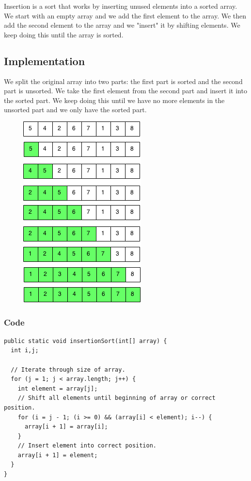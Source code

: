 \documentclass[11pt,oneside]{book}
\makeatletter
\def\maxwidth#1{\ifdim\Gin@nat@width>#1 #1\else\Gin@nat@width\fi}
\makeatother
\begin{document}
Insertion is a sort that works by inserting unused elements into a sorted array. We start with an empty array and we add the first element to the array. We then add the second element to the array and we "insert" it by shifting elements. We keep doing this until the array is sorted.

\subsection{Implementation}

We split the original array into two parts: the first part is sorted and the second part is unsorted. We take the first element from the second part and insert it into the sorted part. We keep doing this until we have no more elements in the unsorted part and we only have the sorted part.

\vspace{5px}\begin{figure}[H]\centering
        \includegraphics[width=0.66\maxwidth{\textwidth}]{insertion_sort.png}
        \end{figure}

\subsubsection{Code}

\begin{lstlisting}
public static void insertionSort(int[] array) {
  int i,j;

  // Iterate through size of array.
  for (j = 1; j < array.length; j++) {
    int element = array[j];
    // Shift all elements until beginning of array or correct position.
    for (i = j - 1; (i >= 0) && (array[i] < element); i--) {
      array[i + 1] = array[i];
    }
    // Insert element into correct position.
    array[i + 1] = element;
  }
}
\end{lstlisting}
\end{document}
